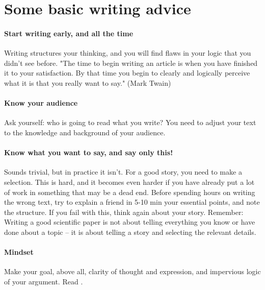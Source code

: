 \documentclass{tufte-book}
\begin{document}
\section{Some basic writing advice}

\paragraph{Start writing early, and all the time} Writing structures your thinking, and you will find flaws in your logic that you didn't see before. "The time to begin writing an article is when you have finished it to your satisfaction. By that time you begin to clearly and logically perceive what it is that you really want to say." (Mark Twain)


\paragraph{Know your audience} Ask yourself: who is going to read what you write?  You need to adjust your text to the knowledge and background of your audience. 


\paragraph{Know what you want to say, and say only this!} Sounds trivial, but in practice it isn't. For a good story, you need to make a selection. This is hard, and it becomes even harder if you have already put a lot of work in something that may be a dead end. Before spending hours on writing the wrong text, try to explain a friend in 5-10 min your essential points, and note the structure. If you fail with this, think again about your story. Remember: Writing a good scientific paper is not about telling everything you know or have done about a topic -- it is about telling a story and selecting the relevant details. 

\paragraph{Mindset} Make your goal, above all, clarity of thought and expression, and impervious logic of your argument. Read \citet{Woodford-Sounderthinkingthrough-1967}.
\end{document}
